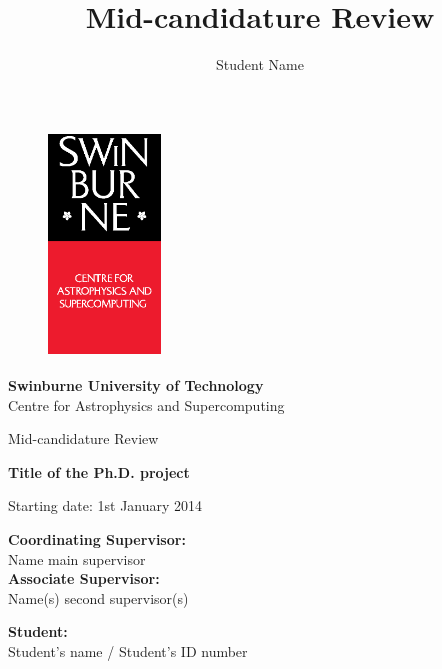 \documentclass[useAMS,usenatbib,onecolumn]{mn2e}
\title{Mid-candidature Review}
\author[Student Name]
 {Student Name}
\begin{document}
\fontsize{11}{12.5}\selectfont
\begin{center}

\begin{figure}
\begin{center}
\includegraphics[height=6cm,width=3cm]{./astro_v.eps}
\end{center}
\end{figure}

{\bf \LARGE S\Large winburne \LARGE U\Large niversity of  \LARGE T\Large echnology\\
\vspace{0.5cm}}
\LARGE C\Large entre for \LARGE A\Large strophysics and \LARGE S\Large upercomputing\\
\vspace{0.5cm}

\large Mid-candidature Review\\
\vspace{0.5cm}



\Huge{\bf Title of the Ph.D. project}

\vspace{3cm}
\large{Starting date: 1st January 2014}
\end{center}


\begin{flushleft}
{\bf Coordinating Supervisor:}\\
Name main supervisor\\
\vspace{0.5cm}
{\bf Associate Supervisor:}\\
Name(s) second supervisor(s)\\
\end{flushleft}

\begin{flushright}
{\bf Student:}\\
Student's name / Student's ID number
\end{flushright}\hspace{8cm}
\end{document}
